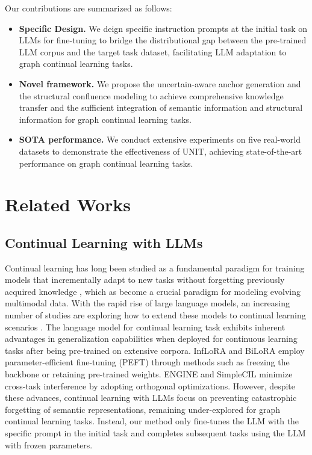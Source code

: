 \documentclass[sigconf]{acmart}
\begin{document}
Our contributions are summarized as follows:
\begin{itemize}
    
	\item \textbf{Specific Design.} 
    We deign specific instruction prompts at the initial task on LLMs for fine-tuning to bridge the distributional gap between the pre-trained LLM corpus and the target task dataset, facilitating LLM adaptation to graph continual learning tasks.
    
	\item \textbf{Novel framework.} 
    We propose the uncertain-aware anchor generation and the structural confluence modeling to achieve comprehensive knowledge transfer and the sufficient integration of semantic information and structural information for graph continual learning tasks.
    
	\item \textbf{SOTA performance.}  
    We conduct extensive experiments on five real-world datasets to demonstrate the effectiveness of UNIT, achieving state-of-the-art performance on graph continual learning tasks.
\end{itemize}




\section{Related Works}
\subsection{Continual Learning with LLMs}
Continual learning has long been studied as a fundamental paradigm for training models that incrementally adapt to new tasks without forgetting previously acquired knowledge \cite{GCL}, which as become a crucial paradigm for modeling evolving multimodal data.
With the rapid rise of large language models, an increasing number of studies are exploring how to extend these models to continual learning scenarios \cite{BERT,llama,lora,Llaga}.
The language model for continual learning task \cite{few_1} exhibits inherent advantages in generalization capabilities when deployed for continuous learning tasks after being pre-trained on extensive corpora.
InfLoRA \cite{Inflora} and BiLoRA \cite{BiLoRA} employ parameter-efficient fine-tuning (PEFT) through methods such as freezing the backbone or retaining pre-trained weights.
ENGINE \cite{ENGINE} and SimpleCIL \cite{SimpleCIL} minimize cross-task interference by adopting orthogonal optimizations.
However, despite these advances, continual learning with LLMs focus on preventing catastrophic forgetting of semantic representations, remaining under-explored for graph continual learning tasks.
Instead, our method only fine-tunes the LLM with the specific prompt in the initial task and completes subsequent tasks using the LLM with frozen parameters.
\end{document}

